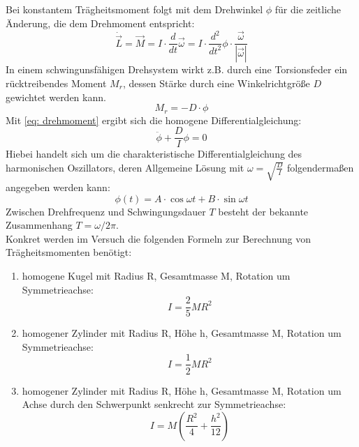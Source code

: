 Bei konstantem Trägheitsmoment folgt mit dem Drehwinkel $\phi$ für die zeitliche Änderung, die dem Drehmoment
entspricht:
\begin{equation}
  \dot{\vec{L}} = \vec{M} = I \cdot \frac{d}{dt}\vec{\omega} =
  I \cdot \frac{d^2}{dt^2} \phi \cdot \frac{\vec{\omega}}{|\vec{\omega}|}
  \label{eq: drehmoment}
\end{equation}
In einem schwingunsfähigen Drehsystem wirkt z.B. durch eine Torsionsfeder ein
rücktreibendes Moment $M_{r}$, dessen Stärke durch eine Winkelrichtgröße $D$ gewichtet
werden kann.
\begin{equation}
  M_{r} = - D \cdot \phi
\end{equation}
Mit \eqref{eq: drehmoment} ergibt sich die homogene Differentialgleichung:
\begin{equation}
  \ddot{\phi} + \frac{D}{I}\phi = 0
\end{equation}
Hiebei handelt sich um die charakteristische Differentialgleichung des harmonischen
Oszillators, deren Allgemeine Lösung mit $\omega = \sqrt{\frac{D}{I}}$ folgendermaßen angegeben werden kann:
\begin{equation}
  \phi(t) = A\cdot \cos{\omega t} + B \cdot \sin{\omega t}
\end{equation}
Zwischen Drehfrequenz und Schwingungsdauer $T$ besteht der bekannte Zusammenhang
$T =\omega / 2\pi$. \\
Konkret werden im Versuch die folgenden Formeln zur Berechnung von Trägheitsmomenten benötigt:
\begin{enumerate}
  \item homogene Kugel mit Radius R, Gesamtmasse M, Rotation um Symmetrieachse:
  \begin{equation}
    I = \frac{2}{5}M R^2
  \end{equation}

  \item homogener Zylinder mit Radius R, Höhe h, Gesamtmasse M, Rotation um Symmetrieachse:
  \begin{equation}
    I = \frac{1}{2} M R^2
  \end{equation}

  \item homogener Zylinder mit Radius R, Höhe h, Gesamtmasse M, Rotation um Achse durch den Schwerpunkt senkrecht zur Symmetrieachse:
  \begin{equation}
    I = M (\frac{R^2}{4} + \frac{h^2}{12})
  \end{equation}
\end{enumerate}
